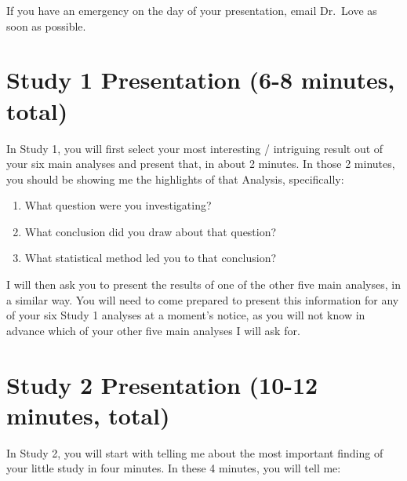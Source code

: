 \documentclass[]{book}
\providecommand{\tightlist}{%
  \setlength{\itemsep}{0pt}\setlength{\parskip}{0pt}}
\theoremstyle{definition}
\theoremstyle{definition}
\theoremstyle{definition}
\theoremstyle{remark}
\begin{document}
If you have an emergency on the day of your presentation, email Dr.~Love
as soon as possible.

\hypertarget{study-1-presentation-6-8-minutes-total}{%
\section{Study 1 Presentation (6-8 minutes,
total)}\label{study-1-presentation-6-8-minutes-total}}

In Study 1, you will first select your most interesting / intriguing
result out of your six main analyses and present that, in about 2
minutes. In those 2 minutes, you should be showing me the highlights of
that Analysis, specifically:

\begin{enumerate}
\def\labelenumi{\alph{enumi}.}
\tightlist
\item
  What question were you investigating?
\item
  What conclusion did you draw about that question?
\item
  What statistical method led you to that conclusion?
\end{enumerate}

I will then ask you to present the results of one of the other five main
analyses, in a similar way. You will need to come prepared to present
this information for any of your six Study 1 analyses at a moment's
notice, as you will not know in advance which of your other five main
analyses I will ask for.

\hypertarget{study-2-presentation-10-12-minutes-total}{%
\section{Study 2 Presentation (10-12 minutes,
total)}\label{study-2-presentation-10-12-minutes-total}}

In Study 2, you will start with telling me about the most important
finding of your little study in four minutes. In these 4 minutes, you
will tell me:
\end{document}
